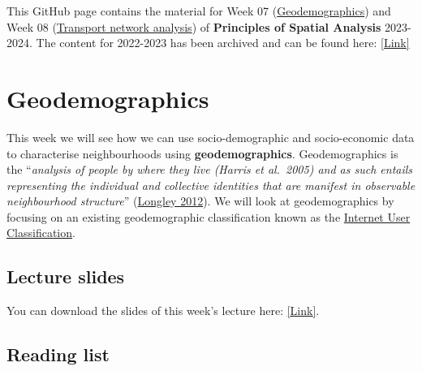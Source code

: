 \documentclass[
  letterpaper,
  DIV=11,
  numbers=noendperiod]{scrreprt}
\begin{document}
\begin{tcolorbox}[enhanced jigsaw, rightrule=.15mm, colback=white, opacityback=0, opacitybacktitle=0.6, coltitle=black, colbacktitle=quarto-callout-note-color!10!white, breakable, arc=.35mm, title=\textcolor{quarto-callout-note-color}{\faInfo}\hspace{0.5em}{Note}, left=2mm, leftrule=.75mm, bottomtitle=1mm, toprule=.15mm, bottomrule=.15mm, colframe=quarto-callout-note-color-frame, toptitle=1mm, titlerule=0mm]

This GitHub page contains the material for Week 07
(\href{01-geodemographics.html}{Geodemographics}) and Week 08
(\href{02-transport-network-analysis.html}{Transport network analysis})
of \textbf{Principles of Spatial Analysis} 2023-2024. The content for
2022-2023 has been archived and can be found here:
\href{https://jtvandijk.github.io/GEOG0114_20222023}{{[}Link{]}}

\end{tcolorbox}


\hypertarget{geodemographics}{%
\chapter{Geodemographics}\label{geodemographics}}

This week we will see how we can use socio-demographic and
socio-economic data to characterise neighbourhoods using
\textbf{geodemographics}. Geodemographics is the ``\emph{analysis of
people by where they live (Harris et al.~2005) and as such entails
representing the individual and collective identities that are manifest
in observable neighbourhood structure}''
(\href{https://doi.org/10.1080/13658816.2012.719623}{Longley 2012}). We
will look at geodemographics by focusing on an existing geodemographic
classification known as the
\href{https://data.cdrc.ac.uk/dataset/internet-user-classification}{Internet
User Classification}.

\hypertarget{lecture-w07}{%
\section{Lecture slides}\label{lecture-w07}}

You can download the slides of this week's lecture here:
\href{https://github.com/jtvandijk/GEOG0114Q/tree/master/slides/w07-psa.pdf}{{[}Link{]}}.

\hypertarget{reading-w07}{%
\section{Reading list}\label{reading-w07}}
\end{document}
